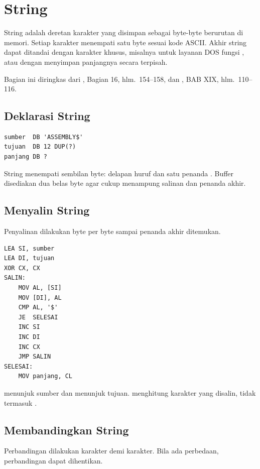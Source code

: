 \section{String}
\label{sec:string}

String adalah deretan karakter yang disimpan sebagai byte-byte
berurutan di memori. Setiap karakter menempati satu byte sesuai kode
ASCII. Akhir string dapat ditandai dengan karakter khusus, misalnya
 untuk layanan DOS fungsi , atau dengan menyimpan
panjangnya secara terpisah.

Bagian ini diringkas dari \cite{gunawan2019}, Bagian 16,
hlm.~154--158, dan \cite{sto2001}, BAB XIX, hlm.~110--116.

\subsection{Deklarasi String}

\begin{lstlisting}[language=MASM, numbers=none]
sumber  DB 'ASSEMBLY$'
tujuan  DB 12 DUP(?)
panjang DB ?
\end{lstlisting}

String  menempati sembilan byte: delapan huruf dan
satu penanda . Buffer  disediakan dua belas
byte agar cukup menampung salinan dan penanda akhir.

\subsection{Menyalin String}

Penyalinan dilakukan byte per byte sampai penanda akhir ditemukan.

\begin{lstlisting}[language=MASM, numbers=none]
LEA SI, sumber
LEA DI, tujuan
XOR CX, CX
SALIN:
    MOV AL, [SI]
    MOV [DI], AL
    CMP AL, '$'
    JE  SELESAI
    INC SI
    INC DI
    INC CX
    JMP SALIN
SELESAI:
    MOV panjang, CL
\end{lstlisting}

 menunjuk sumber dan  menunjuk tujuan. 
menghitung karakter yang disalin, tidak termasuk .

\subsection{Membandingkan String}

Perbandingan dilakukan karakter demi karakter. Bila ada perbedaan,
perbandingan dapat dihentikan.

